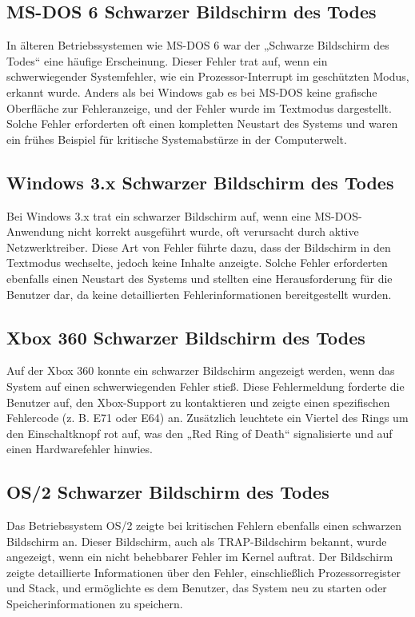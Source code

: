 \documentclass[paper=a4,fontsize=12pt,ngerman,parskip=half]{scrartcl}
\begin{document}
\subsection{MS-DOS 6 Schwarzer Bildschirm des Todes}

In älteren Betriebssystemen wie MS-DOS 6 war der „Schwarze Bildschirm des Todes“ eine häufige Erscheinung. Dieser Fehler trat auf, wenn ein schwerwiegender Systemfehler, wie ein Prozessor-Interrupt im geschützten Modus, erkannt wurde. Anders als bei Windows gab es bei MS-DOS keine grafische Oberfläche zur Fehleranzeige, und der Fehler wurde im Textmodus dargestellt. Solche Fehler erforderten oft einen kompletten Neustart des Systems und waren ein frühes Beispiel für kritische Systemabstürze in der Computerwelt.

\subsection{Windows 3.x Schwarzer Bildschirm des Todes}

Bei Windows 3.x trat ein schwarzer Bildschirm auf, wenn eine MS-DOS-Anwendung nicht korrekt ausgeführt wurde, oft verursacht durch aktive Netzwerktreiber. Diese Art von Fehler führte dazu, dass der Bildschirm in den Textmodus wechselte, jedoch keine Inhalte anzeigte. Solche Fehler erforderten ebenfalls einen Neustart des Systems und stellten eine Herausforderung für die Benutzer dar, da keine detaillierten Fehlerinformationen bereitgestellt wurden.

\subsection{Xbox 360 Schwarzer Bildschirm des Todes}

Auf der Xbox 360 konnte ein schwarzer Bildschirm angezeigt werden, wenn das System auf einen schwerwiegenden Fehler stieß. Diese Fehlermeldung forderte die Benutzer auf, den Xbox-Support zu kontaktieren und zeigte einen spezifischen Fehlercode (z. B. E71 oder E64) an. Zusätzlich leuchtete ein Viertel des Rings um den Einschaltknopf rot auf, was den „Red Ring of Death“ signalisierte und auf einen Hardwarefehler hinwies.

\subsection{OS/2 Schwarzer Bildschirm des Todes}

Das Betriebssystem OS/2 zeigte bei kritischen Fehlern ebenfalls einen schwarzen Bildschirm an. Dieser Bildschirm, auch als TRAP-Bildschirm bekannt, wurde angezeigt, wenn ein nicht behebbarer Fehler im Kernel auftrat. Der Bildschirm zeigte detaillierte Informationen über den Fehler, einschließlich Prozessorregister und Stack, und ermöglichte es dem Benutzer, das System neu zu starten oder Speicherinformationen zu speichern.
\end{document}
